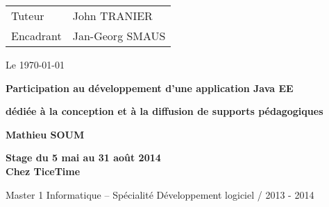 \begin{titlepage}
\parindent=0pt
\begin{tabular}[h]{l@{ : }l}
  Tuteur & John TRANIER \\
  Encadrant & Jan-Georg SMAUS
\end{tabular} \hfill Le \today
\vspace{3.5cm}
\begin{center}
\end{center}
\vspace{2cm}
\hrulefill
\begin{center}\bfseries\Huge
  Participation au développement d’une application Java EE
\end{center}
\hrulefill
\begin{center}\bfseries\Large
  dédiée à la conception et à la diffusion de supports pédagogiques
\end{center}
\vspace*{0.5cm}
\begin{center}\bfseries\Large
  Mathieu SOUM
\end{center}
\vspace*{0.2cm}
\begin{center}\bfseries
  Stage du 5 mai au 31 août 2014\\Chez TiceTime
\end{center}
\vfill
\vspace{2cm}
\begin{flushright}
  Master 1 Informatique -- Spécialité Développement logiciel / 2013 - 2014
\end{flushright}
  
\end{titlepage}
